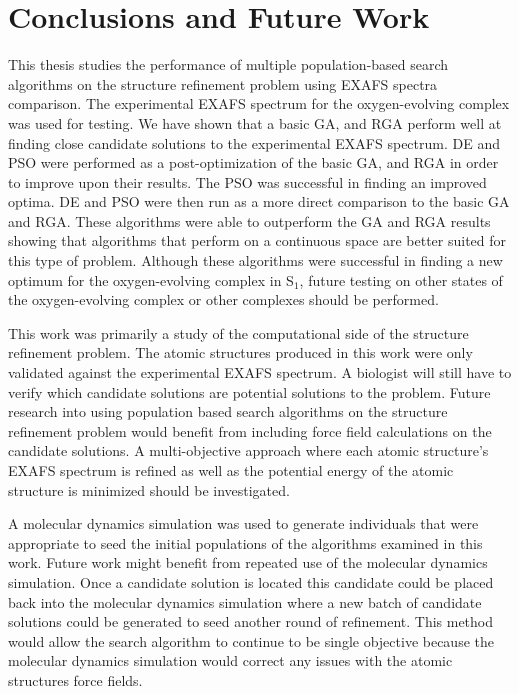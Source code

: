 \chapter{Conclusions and Future Work}

This thesis studies the performance of multiple population-based search algorithms on the structure refinement problem using EXAFS spectra comparison. The experimental EXAFS spectrum for the oxygen-evolving complex was used for testing. We have shown that a basic GA, and RGA perform well at finding close candidate solutions to the experimental EXAFS spectrum. DE and PSO were performed as a post-optimization of the basic GA, and RGA in order to improve upon their results. The PSO was successful in finding an improved optima. DE and PSO were then run as a more direct comparison to the basic GA and RGA. These algorithms were able to outperform the GA and RGA results showing that algorithms that perform on a continuous space are better suited for this type of problem. Although these algorithms were successful in finding a new optimum for the oxygen-evolving complex in S$_{1}$, future testing on other states of the oxygen-evolving complex or other complexes should be performed.

This work was primarily a study of the computational side of the structure refinement problem. The atomic structures produced in this work were only validated against the experimental EXAFS spectrum. A biologist will still have to verify which candidate solutions are potential solutions to the problem. Future research into using population based search algorithms on the structure refinement problem would benefit from including force field calculations on the candidate solutions. A multi-objective approach where each atomic structure's EXAFS spectrum is refined as well as the potential energy of the atomic structure is minimized should be investigated.

A molecular dynamics simulation was used to generate individuals that were appropriate to seed the initial populations of the algorithms examined in this work. Future work might benefit from repeated use of the molecular dynamics simulation. Once a candidate solution is located this candidate could be placed back into the molecular dynamics simulation where a new batch of candidate solutions could be generated to seed another round of refinement. This method would allow the search algorithm to continue to be single objective because the molecular dynamics simulation would correct any issues with the atomic structures force fields.
